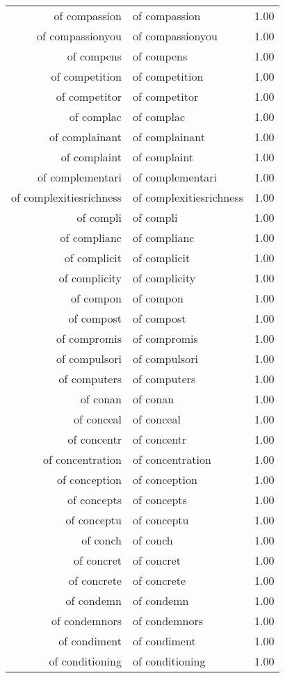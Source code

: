 \begin{table}[ht]
\begin{tabular}{rlr}
  of compassion & of compassion & 1.00 \\ 
  of compassionyou & of compassionyou & 1.00 \\ 
  of compens & of compens & 1.00 \\ 
  of competition & of competition & 1.00 \\ 
  of competitor & of competitor & 1.00 \\ 
  of complac & of complac & 1.00 \\ 
  of complainant & of complainant & 1.00 \\ 
  of complaint & of complaint & 1.00 \\ 
  of complementari & of complementari & 1.00 \\ 
  of complexitiesrichness & of complexitiesrichness & 1.00 \\ 
  of compli & of compli & 1.00 \\ 
  of complianc & of complianc & 1.00 \\ 
  of complicit & of complicit & 1.00 \\ 
  of complicity & of complicity & 1.00 \\ 
  of compon & of compon & 1.00 \\ 
  of compost & of compost & 1.00 \\ 
  of compromis & of compromis & 1.00 \\ 
  of compulsori & of compulsori & 1.00 \\ 
  of computers & of computers & 1.00 \\ 
  of conan & of conan & 1.00 \\ 
  of conceal & of conceal & 1.00 \\ 
  of concentr & of concentr & 1.00 \\ 
  of concentration & of concentration & 1.00 \\ 
  of conception & of conception & 1.00 \\ 
  of concepts & of concepts & 1.00 \\ 
  of conceptu & of conceptu & 1.00 \\ 
  of conch & of conch & 1.00 \\ 
  of concret & of concret & 1.00 \\ 
  of concrete & of concrete & 1.00 \\ 
  of condemn & of condemn & 1.00 \\ 
  of condemnors & of condemnors & 1.00 \\ 
  of condiment & of condiment & 1.00 \\ 
  of conditioning & of conditioning & 1.00 \\ 

\end{tabular}
\end{table}
